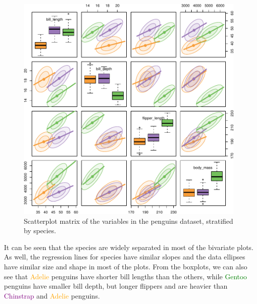 \documentclass[
  letterpaper,
  10pt,
  krantz2]{krantz}
\begin{document}
\begin{figure}[H]

{\centering \includegraphics[width=1\textwidth,height=\textheight]{figs/ch03/fig-peng-spm-1.pdf}

}

\caption{\label{fig-peng-spm}Scatterplot matrix of the variables in the
penguins dataset, stratified by species.}

\end{figure}

It can be seen that the species are widely separated in most of the
bivariate plots. As well, the regression lines for species have similar
slopes and the data ellipses have similar size and shape in most of the
plots. From the boxplots, we can also see that
\textcolor{orange}{Adelie} penguins have shorter bill lengths than the
others, while \textcolor{green}{Gentoo} penguins have smaller bill
depth, but longer flippers and are heavier than
\textcolor{purple}{Chinstrap} and \textcolor{orange}{Adelie} penguins.
\end{document}
